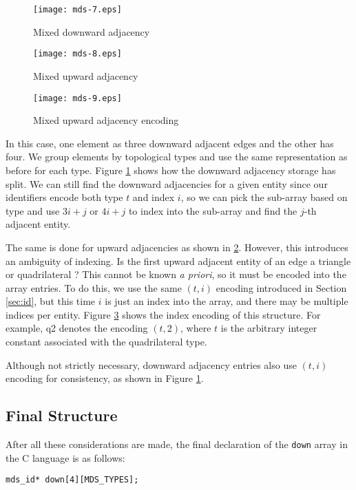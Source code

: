 \documentclass{article}
\begin{document}
\begin{figure}[ht!]
\centering
\texttt{[image: mds-7.eps]}
\caption{Mixed downward adjacency}
\label{fig:mdown}
\end{figure}

\begin{figure}[ht!]
\centering
\texttt{[image: mds-8.eps]}
\caption{Mixed upward adjacency}
\label{fig:mup}
\end{figure}

\begin{figure}[ht!]
\centering
\texttt{[image: mds-9.eps]}
\caption{Mixed upward adjacency encoding}
\label{fig:mupn}
\end{figure}

In this case, one element as three downward adjacent edges and the other has
four.
We group elements by topological types and use the same representation as before
for each type.
Figure \ref{fig:mdown} shows how the downward adjacency storage has split.
We can still find the downward adjacencies for a given entity
since our identifiers encode
both type $t$ and index $i$, so we can pick the sub-array based on type and use
$3i+j$ or $4i+j$ to index into the sub-array and find the $j$-th adjacent entity.

The same is done for upward adjacencies as shown in \ref{fig:mup}.
However, this introduces an ambiguity of indexing.
Is the first upward adjacent entity of an edge a triangle or quadrilateral ?
This cannot be known {\it a priori}, so it must be encoded into the array
entries.
To do this, we use the same $(t,i)$ encoding introduced in
Section \ref{sec:id},
but this time $i$ is just an index into the array,
and there may be multiple indices per entity.
Figure \ref{fig:mupn} shows the index encoding of this structure.
For example, q2 denotes the encoding $(t,2)$, where $t$ is the arbitrary
integer constant associated with the quadrilateral type.

Although not strictly necessary, downward adjacency entries also use
$(t,i)$ encoding for consistency, as shown in Figure \ref{fig:mdown}.

\subsection{Final Structure}

After all these considerations are made, the final declaration of
the \texttt{down} array in the C language is as follows:

\begin{verbatim}
mds_id* down[4][MDS_TYPES];
\end{verbatim}
\end{document}
